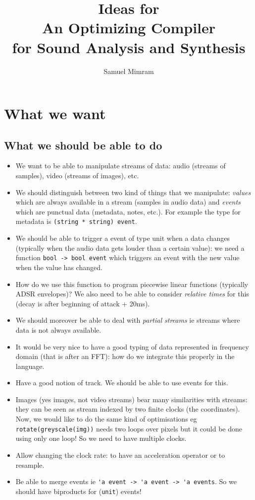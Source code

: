 \documentclass[a4paper,titlepage]{article}
\title{Ideas for \\An Optimizing Compiler \\for Sound Analysis and Synthesis}
\author{Samuel Mimram}
\begin{document}
\maketitle
\tableofcontents
\newpage

\section{What we want}
\subsection{What we should be able to do}
\begin{itemize}
\item We want to be able to manipulate streams of data: audio (streams of
  samples), video (streams of images), etc.
\item We should distinguish between two kind of things that we manipulate:
  \emph{values} which are always available in a stream (samples in audio data)
  and \emph{events} which are punctual data (metadata, notes, etc.). For example
  the type for metadata is \verb|(string * string) event|.
\item We should be able to trigger a event of type unit when a data changes
  (typically when the audio data gets louder than a certain value): we need a
  function \verb|bool -> bool event| which triggers an event with the new value
  when the value has changed.
\item How do we use this function to program piecewise linear functions
  (typically ADSR envelopes)? We also need to be able to consider \emph{relative
    times} for this (decay is after beginning of attack + 20ms).
\item We should moreover be able to deal with \emph{partial streams} ie streams
  where data is not always available.
\item It would be very nice to have a good typing of data represented in
  frequency domain (that is after an FFT): how do we integrate this properly in
  the language.
\item Have a good notion of track. We should be able to use events for this.
\item Images (yes images, not video streams) bear many similarities with
  streams: they can be seen as stream indexed by two finite clocks (the
  coordinates). Now, we would like to do the same kind of optimisations eg
  \verb|rotate(greyscale(img))| needs two loops over pixels but it could be done
  using only one loop! So we need to have multiple clocks.
\item Allow changing the clock rate: to have an acceleration operator or to
  resample.
\item Be able to merge events ie \verb|'a event -> 'a event -> 'a events|. So we
  should have biproducts for (\verb|unit|) events!
\end{itemize}
\end{document}
